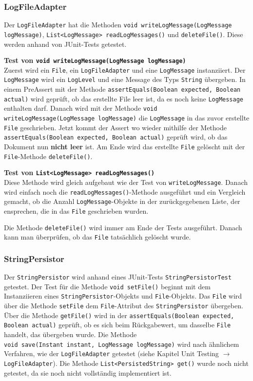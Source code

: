 \documentclass[12pt,a4paper,twosided]{scrartcl}
\begin{document}
\subsubsection{LogFileAdapter}
Der \texttt{LogFileAdapter} hat die Methoden \texttt{void writeLogMessage(LogMessage logMessage)}, \texttt{List<LogMessage> readLogMessages()} und \texttt{deleteFile()}. Diese werden anhand von JUnit-Tests getestet.

\textbf{Test von \texttt{void writeLogMessage(LogMessage logMessage)}} \\
Zuerst wird ein \texttt{File}, ein \texttt{LogFileAdapter} und eine \texttt{LogMessage} instanziiert. Der \texttt{LogMessage} wird ein \texttt{LogLevel} und eine Message des Typs \texttt{String} übergeben. In einem PreAssert mit der Methode \texttt{assertEquals(Boolean expected, Boolean actual)} wird geprüft, ob das erstellte File leer ist, da es noch keine \texttt{LogMessage} enthalten darf. Danach wird mit der Methode \texttt{void writeLogMessage(LogMessage logMessage)} die \texttt{LogMessage} in das zuvor erstellte \texttt{File} geschrieben. Jetzt kommt der Assert wo wieder mithilfe der Methode \texttt{assertEquals(Boolean expected, Boolean actual)} geprüft wird, ob das Dokument nun \textbf{nicht leer} ist. Am Ende wird das erstellte \texttt{File} gelöscht mit der \texttt{File}-Methode \texttt{deleteFile()}.

\textbf{Test von \texttt{List<LogMessage> readLogMessages()}} \\
Diese Methode wird gleich aufgebaut wie der Test von \texttt{writeLogMessage}. Danach wird einfach noch die \texttt{readLogMessages()}-Methode ausgeführt und ein Vergleich gemacht, ob die Anzahl \texttt{LogMessage}-Objekte in der zurückgegebenen Liste, der ensprechen, die in das \texttt{File} geschrieben wurden.

Die Methode \texttt{deleteFile()} wird immer am Ende der Tests ausgeführt. Danach kann man überprüfen, ob das \texttt{File} tatsächlich gelöscht wurde.

\subsubsection{StringPersistor}
Der \texttt{StringPersistor} wird anhand eines JUnit-Tests \texttt{StringPersistorTest} getestet. Der Test für die Methode \texttt{void setFile()} beginnt mit dem Instanziieren eines \texttt{StringPersistor}-Objekts und \texttt{File}-Objekts. Das \texttt{File} wird über die Methode \texttt{setFile} dem \texttt{File}-Attribut des \texttt{StringPersistor} übergeben. Über die Methode \texttt{getFile()} wird in der \texttt{assertEquals(Boolean expected, Boolean actual)} geprüft, ob es sich beim Rückgabewert, um dasselbe \texttt{File} handelt, das übergeben wurde. Die Methode \\ \texttt{void save(Instant instant, LogMessage logMessage)} wird nach ähnlichem Verfahren, wie der \texttt{LogFileAdapter} getestet (siehe Kapitel Unit Testing $\rightarrow$ \texttt{LogFileAdapter}). Die Methode \texttt{List<PersistedString> get()} wurde noch nicht getestet, da sie noch nicht vollständig implementiert ist.
\end{document}
